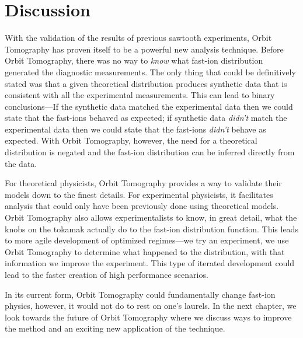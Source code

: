 \section{Discussion}
With the validation of the results of previous sawtooth experiments, Orbit Tomography has proven itself to be a powerful new analysis technique.
Before Orbit Tomography, there was no way to \textit{know} what fast-ion distribution generated the diagnostic measurements.
The only thing that could be definitively stated was that a given theoretical distribution produces synthetic data that is consistent with all the experimental measurements.
This can lead to binary conclusions---If the synthetic data matched the experimental data then we could state that the fast-ions behaved as expected; if synthetic data \textit{didn't} match the experimental data then we could state that the fast-ions \textit{didn't} behave as expected.
With Orbit Tomography, however, the need for a theoretical distribution is negated and the fast-ion distribution can be inferred directly from the data.

For theoretical physicists, Orbit Tomography provides a way to validate their models down to the finest details.
For experimental physicists, it facilitates analysis that could only have been previously done using theoretical models.
Orbit Tomography also allows experimentalists to know, in great detail, what the knobs on the tokamak actually do to the fast-ion distribution function.
This leads to more agile development of optimized regimes---we try an experiment, we use Orbit Tomography to determine what happened to the distribution, with that information we improve the experiment. This type of iterated development could lead to the faster creation of high performance scenarios. 

In its current form, Orbit Tomography could fundamentally change fast-ion physics, however, it would not do to rest on one's laurels. In the next chapter, we look towards the future of Orbit Tomography where we discuss ways to improve the method and an exciting new application of the technique.